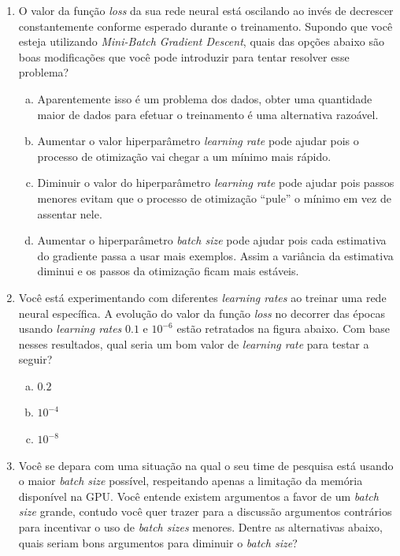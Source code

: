 \documentclass{dlproblemset}
\begin{document}
\begin{enumerate}[1)]
    \item O valor da função \textit{loss} da sua rede neural está oscilando ao invés de decrescer constantemente conforme esperado durante o treinamento. Supondo que você esteja utilizando \textit{Mini-Batch Gradient Descent}, quais das opções abaixo são boas modificações que você pode introduzir para tentar resolver esse problema?

	\begin{enumerate}[(a)]
	    \item Aparentemente isso é um problema dos dados, obter uma quantidade maior de dados para efetuar o treinamento é uma alternativa razoável.
	    \item Aumentar o valor hiperparâmetro \textit{learning rate} pode ajudar pois o processo de otimização vai chegar a um mínimo mais rápido.
	    \item Diminuir o valor do hiperparâmetro \textit{learning rate} pode ajudar pois passos menores evitam que o processo de otimização ``pule'' o mínimo em vez de assentar nele.
	    \item Aumentar o hiperparâmetro \textit{batch size} pode ajudar pois cada estimativa do gradiente passa a usar mais exemplos. Assim a variância da estimativa diminui e os passos da otimização ficam mais estáveis.
	\end{enumerate}

    \item Você está experimentando com diferentes \textit{learning rates} ao treinar uma rede neural específica. A evolução do valor da função \textit{loss} no decorrer das épocas usando \textit{learning rates} $0.1$ e $10^{-6}$ estão retratados na figura abaixo. Com base nesses resultados, qual seria um bom valor de \textit{learning rate} para testar a seguir?

    \begin{figure}[H]
        \centering
        \resizebox{0.55\linewidth}{!}{}
    \end{figure}

    \begin{enumerate}[(a)]
	    \item $0.2$
	    \item $10^{-4}$
	    \item $10^{-8}$
    \end{enumerate}

    \item Você se depara com uma situação na qual o seu time de pesquisa está usando o maior \textit{batch size} possível, respeitando apenas a limitação da memória disponível na GPU. Você entende existem argumentos a favor de um \textit{batch size} grande, contudo você quer trazer para a discussão argumentos contrários para incentivar o uso de \textit{batch sizes} menores. Dentre as alternativas abaixo, quais seriam bons argumentos para diminuir o \textit{batch size}?


\end{enumerate}
\end{document}

